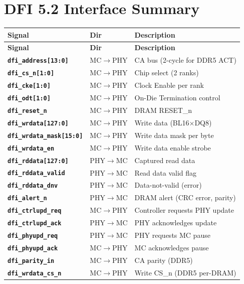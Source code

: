 \documentclass[11pt,a4paper]{article}
\newcommand{\sym}[1]{\texttt{\textbf{#1}}}
\begin{document}
\section{DFI 5.2 Interface Summary}

\begin{longtable}{L{4.5cm} L{2cm} L{8cm}}
\toprule
\textbf{Signal} & \textbf{Dir} & \textbf{Description} \\
\midrule
\endfirsthead\toprule\textbf{Signal}&\textbf{Dir}&\textbf{Description}\\\midrule\endhead\bottomrule\endfoot
{}
\sym{dfi\_address[13:0]}  & MC$\to$PHY & CA bus (2-cycle for DDR5 ACT) \\
\sym{dfi\_cs\_n[1:0]}     & MC$\to$PHY & Chip select (2 ranks) \\
\sym{dfi\_cke[1:0]}       & MC$\to$PHY & Clock Enable per rank \\
\sym{dfi\_odt[1:0]}       & MC$\to$PHY & On-Die Termination control \\
\sym{dfi\_reset\_n}       & MC$\to$PHY & DRAM RESET\_n \\
\sym{dfi\_wrdata[127:0]}  & MC$\to$PHY & Write data (BL16$\times$DQ8) \\
\sym{dfi\_wrdata\_mask[15:0]} & MC$\to$PHY & Write data mask per byte \\
\sym{dfi\_wrdata\_en}     & MC$\to$PHY & Write data enable strobe \\
\sym{dfi\_rddata[127:0]}  & PHY$\to$MC & Captured read data \\
\sym{dfi\_rddata\_valid}  & PHY$\to$MC & Read data valid flag \\
\sym{dfi\_rddata\_dnv}    & PHY$\to$MC & Data-not-valid (error) \\
\sym{dfi\_alert\_n}       & PHY$\to$MC & DRAM alert (CRC error, parity) \\
\sym{dfi\_ctrlupd\_req}   & MC$\to$PHY & Controller requests PHY update \\
\sym{dfi\_ctrlupd\_ack}   & PHY$\to$MC & PHY acknowledges update \\
\sym{dfi\_phyupd\_req}    & PHY$\to$MC & PHY requests MC pause \\
\sym{dfi\_phyupd\_ack}    & MC$\to$PHY & MC acknowledges pause \\
\sym{dfi\_parity\_in}     & MC$\to$PHY & CA parity (DDR5) \\
\sym{dfi\_wrdata\_cs\_n}  & MC$\to$PHY & Write CS\_n (DDR5 per-DRAM) \\
\end{longtable}
\end{document}
